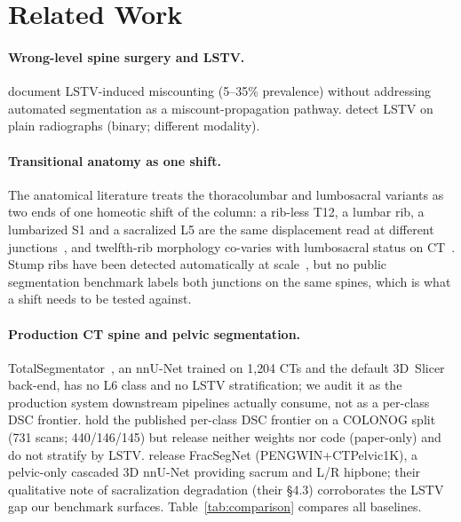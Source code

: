 \documentclass{article}
\newcommand{\TS}{TotalSegmentator}
\begin{document}
\section{Related Work}
\label{sec:related}

\paragraph{Wrong-level spine surgery and LSTV.}
\citep{Konin2010LumbosacralRelevance,Carrino2011EffectImaging,Sekharappa2014LumbosacralSignificance}
document LSTV-induced miscounting (5--35\% prevalence) without
addressing automated segmentation as a miscount-propagation
pathway. \citet{Kwak2025AutomatedModel} detect LSTV on plain
radiographs (binary; different modality).

\paragraph{Transitional anatomy as one shift.}
The anatomical literature treats the thoracolumbar and
lumbosacral variants as two ends of one homeotic shift of
the column: a rib-less T12, a lumbar rib, a lumbarized S1
and a sacralized L5 are the same displacement read at
different
junctions~\citep{DuPlessis2018Homeotic,Poolman2023TransitionalVertebrae},
and twelfth-rib morphology co-varies with lumbosacral
status on CT~\citep{Nagata2025RibLSTV}. Stump ribs have
been detected automatically at
scale~\citep{Moller2025StumpRib}, but no public
segmentation benchmark labels both junctions on the same
spines, which is what a shift needs to be tested against.

\paragraph{Production CT spine and pelvic segmentation.}
\TS{}~\citep{Wasserthal2023TotalSegmentator:Images}, an nnU-Net
trained on 1{,}204 CTs and the default 3D~Slicer back-end,
has no L6 class and no LSTV stratification; we audit it as
the production system downstream pipelines actually consume,
not as a per-class DSC frontier.
\citet{Li2025LumbarMechanism} hold the published per-class
DSC frontier on a COLONOG split (731 scans; 440/146/145)
but release neither weights nor code (paper-only) and do
not stratify by LSTV. \citet{Liu2025AutomaticDataset}
release FracSegNet (PENGWIN+CTPelvic1K), a pelvic-only
cascaded 3D nnU-Net providing sacrum and L/R hipbone; their
qualitative note of sacralization degradation (their
\S4.3) corroborates the LSTV gap our benchmark surfaces.
Table~\ref{tab:comparison} compares all baselines.
\end{document}
